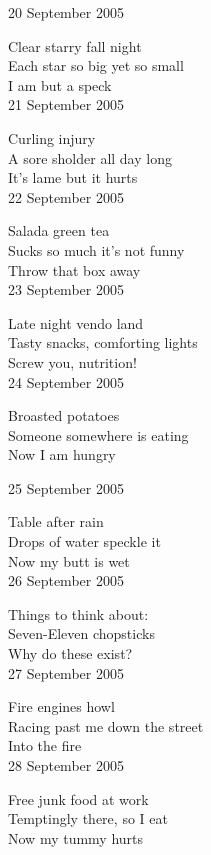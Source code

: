 \documentclass[12pt]{article}
\begin{document}
20 September 2005

Clear starry fall night \\
Each star so big yet so small \\
I am but a speck \\

21 September 2005

Curling injury \\
A sore sholder all day long \\
It's lame but it hurts \\


22 September 2005

Salada green tea \\
Sucks so much it's not funny \\
Throw that box away \\

23 September 2005

Late night vendo land \\
Tasty snacks, comforting lights \\
Screw you, nutrition! \\

24 September 2005

Broasted potatoes \\
Someone somewhere is eating \\
Now I am hungry \\

\newpage

25 September 2005

Table after rain \\
Drops of water speckle it \\
Now my butt is wet \\

26 September 2005

Things to think about: \\
Seven-Eleven chopsticks \\
Why do these exist? \\

27 September 2005

Fire engines howl \\
Racing past me down the street \\
Into the fire \\


28 September 2005

Free junk food at work \\
Temptingly there, so I eat \\
Now my tummy hurts \\
\end{document}
